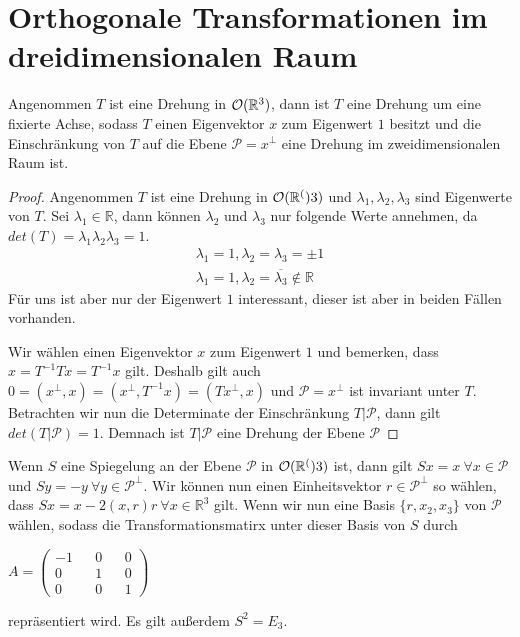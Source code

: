 \section{Orthogonale Transformationen im dreidimensionalen Raum}
\begin{theorem}
 Angenommen $T$ ist eine Drehung in ${\mathcal{O}(\mathbb{R}^3)}$, dann ist $T$ eine Drehung um eine fixierte Achse, sodass $T$ einen Eigenvektor $x$ zum Eigenwert $1$ besitzt und die Einschränkung von $T$ auf die Ebene $\mathcal{P}=x^{\perp}$ eine Drehung im zweidimensionalen Raum ist.
\end{theorem}
\begin{proof}
 Angenommen $T$ ist eine Drehung in ${\mathcal{O}(\mathbb{R}^()}3)$ und $\lambda_1,\lambda_2,\lambda_3$ sind Eigenwerte von $T$. Sei $\lambda_1 \in \mathbb{R}$, dann können $\lambda_2$ und $\lambda_3$ nur folgende Werte annehmen, da $det(T)=\lambda_1\lambda_2\lambda_3=1$.
 \begin{align}
  \lambda_1=1, \lambda_2=\lambda_3=\pm1 \\
  \lambda_1=1, \lambda_2=\overline{\lambda_3}\notin \mathbb{R}
 \end{align}
Für uns ist aber nur der Eigenwert $1$ interessant, dieser ist aber in beiden Fällen vorhanden.

Wir wählen einen Eigenvektor $x$ zum Eigenwert $1$ und bemerken, dass $x=T^{-1}Tx=T^{-1}x$ gilt. Deshalb gilt auch $0=(x^{\perp},x)=(x^{\perp},T^{-1}x)=(Tx^{\perp},x)$ und $\mathcal{P}=x^{\perp}$ ist invariant unter $T$. Betrachten wir nun die Determinate der Einschränkung $T|\mathcal{P}$, dann gilt $det(T|\mathcal{P})=1$. Demnach ist $T|\mathcal{P}$ eine Drehung der Ebene $\mathcal{P}$
\end{proof}
\begin{bem}
 Wenn $S$ eine Spiegelung an der Ebene $\mathcal{P}$ in ${\mathcal{O}(\mathbb{R}^()}3)$ ist, dann gilt $Sx=x \ \forall x \in \mathcal{P}$ und $Sy=-y \ \forall y \in \mathcal{P}^{\perp}$. Wir können nun einen Einheitsvektor $r \in \mathcal{P}^{\perp}$ so wählen, dass $Sx=x-2(x,r)r \ \forall x\in \mathbb{R}^3$ gilt. Wenn wir nun eine Basis $\{r,x_2,x_3\}$ von $\mathcal{P}$ wählen, sodass die Transformationsmatirx unter dieser Basis von $S$ durch 
 \begin{center}
  $A= \begin{pmatrix}
        -1 && 0 && 0 \\
        0 && 1 && 0 \\
        0 && 0 && 1 
       \end{pmatrix}$
 \end{center}
repräsentiert wird. Es gilt außerdem $S^2 = E_3$.
\end{bem}
